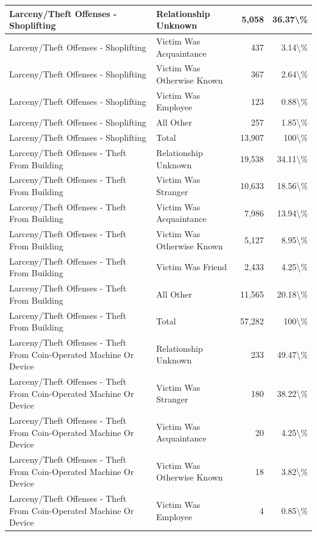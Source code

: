 \documentclass[
]{krantz}
\begin{document}
\begin{longtable}[t]{l|l|r|r}
\hline
Larceny/Theft Offenses - Shoplifting & Relationship Unknown & 5,058 & 36.37\textbackslash{}\%\\
\hline
Larceny/Theft Offenses - Shoplifting & Victim Was Acquaintance & 437 & 3.14\textbackslash{}\%\\
\hline
Larceny/Theft Offenses - Shoplifting & Victim Was Otherwise Known & 367 & 2.64\textbackslash{}\%\\
\hline
Larceny/Theft Offenses - Shoplifting & Victim Was Employee & 123 & 0.88\textbackslash{}\%\\
\hline
Larceny/Theft Offenses - Shoplifting & All Other & 257 & 1.85\textbackslash{}\%\\
\hline
Larceny/Theft Offenses - Shoplifting & Total & 13,907 & 100\textbackslash{}\%\\
\hline
Larceny/Theft Offenses - Theft From Building & Relationship Unknown & 19,538 & 34.11\textbackslash{}\%\\
\hline
Larceny/Theft Offenses - Theft From Building & Victim Was Stranger & 10,633 & 18.56\textbackslash{}\%\\
\hline
Larceny/Theft Offenses - Theft From Building & Victim Was Acquaintance & 7,986 & 13.94\textbackslash{}\%\\
\hline
Larceny/Theft Offenses - Theft From Building & Victim Was Otherwise Known & 5,127 & 8.95\textbackslash{}\%\\
\hline
Larceny/Theft Offenses - Theft From Building & Victim Was Friend & 2,433 & 4.25\textbackslash{}\%\\
\hline
Larceny/Theft Offenses - Theft From Building & All Other & 11,565 & 20.18\textbackslash{}\%\\
\hline
Larceny/Theft Offenses - Theft From Building & Total & 57,282 & 100\textbackslash{}\%\\
\hline
Larceny/Theft Offenses - Theft From Coin-Operated Machine Or Device & Relationship Unknown & 233 & 49.47\textbackslash{}\%\\
\hline
Larceny/Theft Offenses - Theft From Coin-Operated Machine Or Device & Victim Was Stranger & 180 & 38.22\textbackslash{}\%\\
\hline
Larceny/Theft Offenses - Theft From Coin-Operated Machine Or Device & Victim Was Acquaintance & 20 & 4.25\textbackslash{}\%\\
\hline
Larceny/Theft Offenses - Theft From Coin-Operated Machine Or Device & Victim Was Otherwise Known & 18 & 3.82\textbackslash{}\%\\
\hline
Larceny/Theft Offenses - Theft From Coin-Operated Machine Or Device & Victim Was Employee & 4 & 0.85\textbackslash{}\%\\

\end{longtable}
\end{document}
